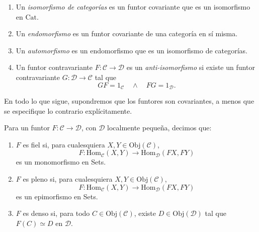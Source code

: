 \documentclass[tesis]{subfiles}
\begin{document}
\begin{Def}\label{Def: Isomorfismo de categorías, endofuntor y automorfismo}\leavevmode
    \begin{enumerate}[label=(\alph*)]
    
        \item Un \emph{isomorfismo de categorías} es un funtor covariante que es un isomorfismo en $\text{Cat}$.

        \item Un \emph{endomorfismo} es un funtor covariante de una categoría en sí misma.

        \item Un \emph{automorfismo} es un endomorfismo que es un isomorfismo de categorías.

        \item Un funtor contravariante $F:\mathscr{C}\to \mathscr{D}$ es un \emph{anti-isomorfismo} si existe un funtor contravariante $G:\mathscr{D}\to \mathscr{C}$ tal que
            \[
            GF = 1_\mathscr{C} \quad \land \quad FG=1_\mathscr{D}.
            \] 
    \end{enumerate}
\end{Def}

\begin{Nota}
    En todo lo que sigue, supondremos que los funtores son covariantes, a menos que se especifique lo contrario explícitamente.
\end{Nota}

\begin{Def}\label{Def: Funtor fiel, pleno y denso}
    Para un funtor $F:\mathscr{C}\to \mathscr{D}$, con $\mathscr{D}$ localmente pequeña, decimos que:

    \begin{enumerate}[label=(\alph*)]
    
        \item $F$ es fiel si, para cualesquiera $X,Y\in\text{Obj}(\mathscr{C})$,
            \[
                F:\text{Hom}_\mathscr{C}(X,Y)\to \text{Hom}_\mathscr{D}(FX,FY)
            \] 
            es un monomorfismo en Sets.

        \item $F$ es pleno si, para cualesquiera $X,Y\in\text{Obj}(\mathscr{C})$,
            \[
                F:\text{Hom}_\mathscr{C}(X,Y)\to \text{Hom}_\mathscr{D}(FX,FY)
            \] 
            es un epimorfismo en Sets.

        \item $F$ es denso si, para todo $C\in\text{Obj}(\mathscr{C})$, existe $D\in\text{Obj}(\mathscr{D})$ tal que $F(C)\simeq D$ en $\mathscr{D}$.
    \end{enumerate}
\end{Def}
\end{document}
